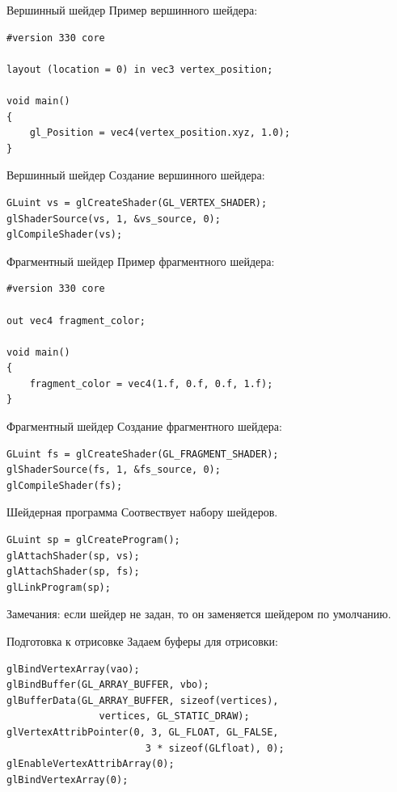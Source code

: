 \documentclass[aspectration=1610,t]{beamer}
\begin{document}
\begin{frame}[fragile]{Вершинный шейдер}
    Пример вершинного шейдера:
    {\small \begin{lstlisting}
#version 330 core

layout (location = 0) in vec3 vertex_position;

void main()
{
    gl_Position = vec4(vertex_position.xyz, 1.0);
}
    \end{lstlisting}}
\end{frame}

\begin{frame}[fragile]{Вершинный шейдер}
    Создание вершинного шейдера:
    {\small \begin{lstlisting}
GLuint vs = glCreateShader(GL_VERTEX_SHADER);
glShaderSource(vs, 1, &vs_source, 0);
glCompileShader(vs);
    \end{lstlisting}}
\end{frame}

\begin{frame}[fragile]{Фрагментный шейдер}
    Пример фрагментного шейдера:
    {\small \begin{lstlisting}
#version 330 core

out vec4 fragment_color;

void main()
{
    fragment_color = vec4(1.f, 0.f, 0.f, 1.f);
}
    \end{lstlisting}}
\end{frame}

\begin{frame}[fragile]{Фрагментный шейдер}
    Создание фрагментного шейдера:
    {\small \begin{lstlisting}
GLuint fs = glCreateShader(GL_FRAGMENT_SHADER);
glShaderSource(fs, 1, &fs_source, 0);
glCompileShader(fs);
    \end{lstlisting}}
\end{frame}

\begin{frame}[fragile]{Шейдерная программа}
    Соотвествует набору шейдеров.
    {\small \begin{lstlisting}
GLuint sp = glCreateProgram();
glAttachShader(sp, vs);
glAttachShader(sp, fs);
glLinkProgram(sp);
    \end{lstlisting}}
    Замечания: если шейдер не задан, то он заменяется шейдером по умолчанию.
\end{frame}

\begin{frame}[fragile]{Подготовка к отрисовке}
    Задаем буферы для отрисовки:
    {\small \begin{lstlisting}
glBindVertexArray(vao);
glBindBuffer(GL_ARRAY_BUFFER, vbo); 
glBufferData(GL_ARRAY_BUFFER, sizeof(vertices),
                vertices, GL_STATIC_DRAW); 
glVertexAttribPointer(0, 3, GL_FLOAT, GL_FALSE,
                        3 * sizeof(GLfloat), 0);
glEnableVertexAttribArray(0);
glBindVertexArray(0);
    \end{lstlisting}}
\end{frame}
\end{document}
